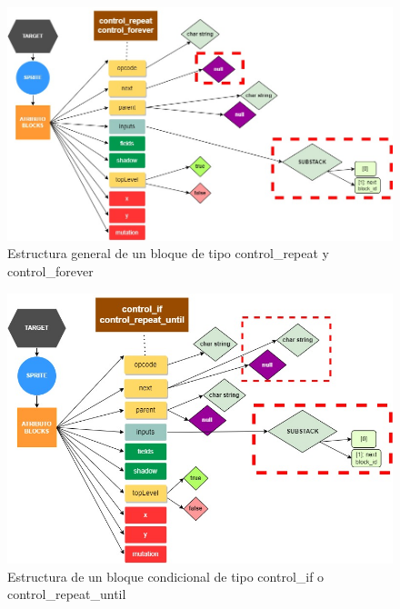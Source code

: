 \documentclass[a4paper, 12pt]{book}
\begin{document}
\begin{figure}
  \centering
  \includegraphics[width=15cm, keepaspectratio]{img/block_loop.jpg}
  \caption{Estructura general de un bloque de tipo control\_repeat y control\_forever}
  \label{fig:loopsforever}
\end{figure}

\begin{figure}
	\centering
  \includegraphics[width=15cm, keepaspectratio]{img/block_controlif.jpg}
  \caption{Estructura de un bloque condicional de tipo control\_if o control\_repeat\_until}
  \label{fig:controlblock}
\end{figure}
\end{document}
